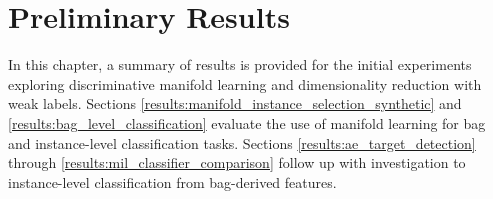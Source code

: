 \chapter{Preliminary Results} \label{ch:Results}
In this chapter, a summary of results is provided for the initial experiments exploring discriminative manifold learning and dimensionality reduction with weak labels. Sections \ref{results:manifold_instance_selection_synthetic} and \ref{results:bag_level_classification} evaluate the use of manifold learning for bag and instance-level classification tasks.  Sections \ref{results:ae_target_detection} through \ref{results:mil_classifier_comparison} follow up with investigation to instance-level classification from bag-derived features.

\begin{comment}


\subsection{Instance-level Classification and Label Refinement} \label{results:manifold_instance_selection_synthetic}

\begin{figure*}[h!]
	\begin{subfigure}[t]{0.5\textwidth}
	    \hspace{-1cm}
		\texttt{[image: "results/instance\_refinement/quad\_surfaces\_separable"]}
		\caption{Separable quadratic surfaces \newline without noise}
	\end{subfigure}%
	\hfill
	\begin{subfigure}[t]{0.5\textwidth}
		\texttt{[image: "results/instance\_refinement/quad\_surfaces\_separable\_w\_noise"]}
		\caption{Separable quadratic surfaces with \newline $\epsilon=0.02$ noise}
	\end{subfigure}
	\begin{subfigure}[t]{0.5\textwidth}
	    \hspace{-1cm}
		\texttt{[image: "results/instance\_refinement/quad\_surfaces\_nonseparable"]}
		\caption{Non-separable quadratic surfaces \newline without noise}
	\end{subfigure}%
	\hfill
	\begin{subfigure}[t]{0.5\textwidth}
		\texttt{[image: "results/instance\_refinement/quad\_surfaces\_nonseparable\_w\_noise"]}
		\caption{Non-separable quadratic surfaces with \newline $\epsilon=0.02$ noise}
	\end{subfigure}
	

\end{comment}
